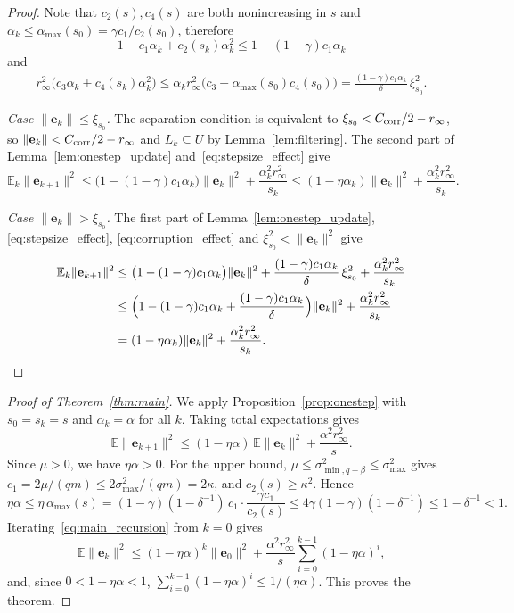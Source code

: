 \documentclass[pdflatex,sn-mathphys-num]{sn-jnl}
\theoremstyle{thmstyleone}
\theoremstyle{thmstylethree}
\newcommand{\ve}{\mathbf{e}}
\begin{document}
\begin{proof} Note that $c_2(s), c_4(s)$ are both nonincreasing in $s$ and
$\alpha_k\le\alpha_{\max}(s_0)=\gamma c_1/c_2(s_0)$,
therefore
\begin{equation}
\label{eq:stepsize_effect}
1-c_1\alpha_k+c_2(s_k)\alpha_k^2\le1-(1-\gamma)c_1\alpha_k 
\end{equation}
and
\begin{equation}
\label{eq:corruption_effect}
\begin{aligned}
r_\infty^2\bigl(c_3\alpha_k+c_4(s_k)\alpha_k^2\bigr)
\le\alpha_kr_\infty^2\bigl(c_3+\alpha_{\max}(s_0)c_4(s_0)\bigr)
=\frac{(1-\gamma)c_1\alpha_k}{\delta}\,\xi_{s_0}^2 .
\end{aligned}
\end{equation}

\noindent\emph{Case $\|\ve_k\|\le\xi_{s_0}$.} The separation condition is equivalent
to $\xi_{s_0}<C_{\rm corr}/2-r_\infty$, so
$\|\ve_k\|<C_{\rm corr}/2-r_\infty$ and $L_k\subseteq U$ by
Lemma~\ref{lem:filtering}. The second part of
Lemma~\ref{lem:onestep_update} and~\eqref{eq:stepsize_effect} give
\[
\mathbb E_k\|\ve_{k+1}\|^2
\le\bigl(1-(1-\gamma)c_1\alpha_k\bigr)\|\ve_k\|^2
+\frac{\alpha_k^2r_\infty^2}{s_k}
\le(1-\eta\alpha_k)\|\ve_k\|^2+\frac{\alpha_k^2r_\infty^2}{s_k}.
\]

\noindent\emph{Case $\|\ve_k\|>\xi_{s_0}$.} The first part of
Lemma~\ref{lem:onestep_update}, \eqref{eq:stepsize_effect},
\eqref{eq:corruption_effect} and $\xi_{s_0}^2<\|\ve_k\|^2$ give
\[
\begin{aligned}
\mathbb E_k\|\ve_{k+1}\|^2
&\le\bigl(1-(1-\gamma)c_1\alpha_k\bigr)\|\ve_k\|^2
+\frac{(1-\gamma)c_1\alpha_k}{\delta}\,\xi_{s_0}^2
+\frac{\alpha_k^2r_\infty^2}{s_k}\\
&\le\Bigl(1-(1-\gamma)c_1\alpha_k+\frac{(1-\gamma)c_1\alpha_k}{\delta}\Bigr)
\|\ve_k\|^2+\frac{\alpha_k^2r_\infty^2}{s_k}\\
&=(1-\eta\alpha_k)\|\ve_k\|^2+\frac{\alpha_k^2r_\infty^2}{s_k}.
\end{aligned}
\]
\end{proof}

\begin{proof}[Proof of Theorem~\ref{thm:main}]
We apply Proposition~\ref{prop:onestep} with $s_0=s_k=s$ and
$\alpha_k=\alpha$ for all $k$. Taking total expectations gives
\begin{equation}
\label{eq:main_recursion}
\mathbb E\|\ve_{k+1}\|^2\le(1-\eta\alpha)\,\mathbb E\|\ve_k\|^2
+\frac{\alpha^2r_\infty^2}{s}.
\end{equation}
Since $\mu>0$, we have $\eta\alpha>0$. For the upper bound, $\mu\le
\sigma_{\min,q-\beta}^2\le\sigma_{\max}^2$ gives
$c_1=2\mu/(qm)\le2\sigma_{\max}^2/(qm)=2\kappa$, and $c_2(s)\ge\kappa^2$.
Hence
\[
\eta\alpha\le\eta\,\alpha_{\max}(s)
=(1-\gamma)(1-\delta^{-1})\,c_1\cdot\frac{\gamma c_1}{c_2(s)}
\le4\gamma(1-\gamma)(1-\delta^{-1})\le1-\delta^{-1}<1.
\] Iterating~\eqref{eq:main_recursion} from
$k=0$ gives
\[
\mathbb E\|\ve_k\|^2
\le(1-\eta\alpha)^k\|\ve_0\|^2
+\frac{\alpha^2r_\infty^2}{s}\sum_{i=0}^{k-1}(1-\eta\alpha)^i,
\]
and, since $0<1-\eta\alpha<1$,
$\sum_{i=0}^{k-1}(1-\eta\alpha)^i\le1/(\eta\alpha)$. This proves the
theorem.
\end{proof}
\end{document}
